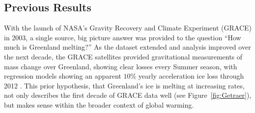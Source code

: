 \documentclass[11pt]{report}
\begin{document}
\subsection{Previous Results}

With the launch of NASA's Gravity Recovery and Climate Experiment (GRACE) in 2003, a single source, big picture answer was provided to the question ``How much is Greenland melting?'' As the dataset extended and analysis improved over the next decade, the GRACE satellites provided gravitational measurements of mass change over Greenland, showing clear losses every Summer season, with regression models showing an apparent $10\%$ yearly acceleration ice loss through 2012
\cite[][]{velicogna2009,angelen2014,enderlin2014,Harig+2016,bevis2019}. This prior hypothesis, that Greenland's ice is melting at increasing rates, not only describes the first decade of GRACE data well (see Figure~\ref{fig:Getraer}), but makes sense within the broader context of global warming.
\end{document}

